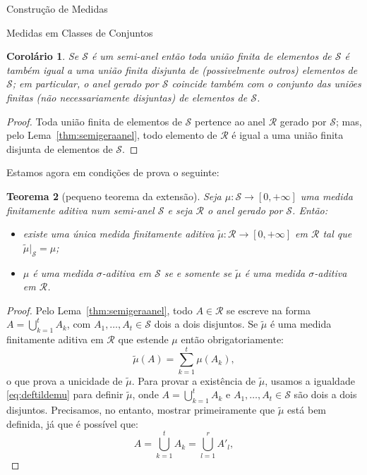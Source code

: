 \documentclass[oneside,final,11pt]{amsbook}
\theoremstyle{remark}\newtheorem{exercise}{Exercício}[chapter]
\theoremstyle{remark}\newtheorem{*exercise}[exercise]{\hbox to 0pt{\hskip 0pt minus 1fil*}Exercício}
\theoremstyle{definition}\newtheorem{exdefin}{Definição}[chapter]
\theoremstyle{plain}\newtheorem{teo}{Teorema}[section]
\theoremstyle{plain}\newtheorem{lem}[teo]{Lema}
\theoremstyle{plain}\newtheorem{prop}[teo]{Proposição}
\theoremstyle{plain}\newtheorem{cor}[teo]{Corolário}
\theoremstyle{definition}\newtheorem{defin}[teo]{Definição}
\theoremstyle{remark}\newtheorem{rem}[teo]{Observação}
\theoremstyle{definition}\newtheorem{notation}[teo]{Notação}
\theoremstyle{definition}\newtheorem{convention}[teo]{Convenção}
\theoremstyle{definition}\newtheorem{example}[teo]{Exemplo}
\numberwithin{section}{chapter}
\numberwithin{equation}{section}
\begin{document}
\begin{chapter}{Construção de Medidas}
\begin{section}{Medidas em Classes de Conjuntos}
\begin{cor}
Se $\mathcal S$ é um semi-anel então toda união finita de elementos de $\mathcal S$ é também igual a uma união
finita disjunta de (possivelmente outros) elementos de $\mathcal S$; em particular, o anel gerado por $\mathcal S$
coincide também com o conjunto das uniões finitas (não necessariamente disjuntas) de elementos de $\mathcal S$.
\end{cor}
\begin{proof}
Toda união finita de elementos de $\mathcal S$ pertence ao anel $\mathcal R$ gerado por $\mathcal S$; mas,
pelo Lema~\ref{thm:semigeraanel}, todo elemento de $\mathcal R$ é igual a uma união finita disjunta de elementos
de $\mathcal S$.
\end{proof}

Estamos agora em condições de prova o seguinte:
\begin{teo}[pequeno teorema da extensão]
\label{thm:peqteoext}
Seja $\mu:\mathcal S\to[0,+\infty]$ uma medida finitamente aditiva num semi-anel $\mathcal S$ e seja
$\mathcal R$ o anel gerado por $\mathcal S$. Então:
\begin{itemize}
\item[(a)] existe uma única medida finitamente aditiva $\tilde\mu:\mathcal R\to[0,+\infty]$ em $\mathcal R$
tal que $\tilde\mu\vert_{\mathcal S}=\mu$;
\item[(b)] $\mu$ é uma medida $\sigma$-aditiva em $\mathcal S$ se e somente se $\tilde\mu$ é uma medida $\sigma$-aditiva
em $\mathcal R$.
\end{itemize}
\end{teo}
\begin{proof}
Pelo Lema~\ref{thm:semigeraanel}, todo $A\in\mathcal R$ se escreve na forma $A=\bigcup_{k=1}^tA_k$,
com $A_1,\ldots,A_t\in\mathcal S$ dois a dois disjuntos. Se $\tilde\mu$ é uma medida finitamente aditiva
em $\mathcal R$ que estende $\mu$ então obrigatoriamente:
\begin{equation}\label{eq:deftildemu}
\tilde\mu(A)=\sum_{k=1}^t\mu(A_k),
\end{equation}
o que prova a unicidade de $\tilde\mu$. Para provar a existência de $\tilde\mu$, usamos a igualdade \eqref{eq:deftildemu}
para definir $\tilde\mu$, onde $A=\bigcup_{k=1}^tA_k$ e $A_1,\ldots,A_t\in\mathcal S$ são dois a dois disjuntos.
Precisamos, no entanto, mostrar primeiramente que $\tilde\mu$ está bem definida, já que é possível que:
\[A=\bigcup_{k=1}^tA_k=\bigcup_{l=1}^rA'_l,\]

\end{proof}
\end{section}
\end{chapter}
\end{document}
